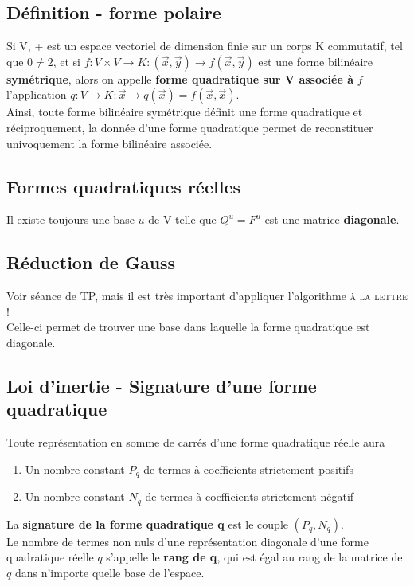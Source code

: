 \documentclass[12pt, a4paper, openany]{article}
\begin{document}
\subsection{Définition - forme polaire}
Si V, + est un espace vectoriel de dimension finie sur un corps K commutatif, tel que $0 \neq 2$, et si $f : V \times V \rightarrow K : (\vec{x}, \vec{y}) \rightarrow f(\vec{x}, \vec{y})$ est une forme bilinéaire \textbf{symétrique}, alors on appelle \textbf{forme quadratique sur V associée à} $f$ l'application $q : V \rightarrow K : \vec{x} \rightarrow q(\vec{x}) = f(\vec{x}, \vec{x})$.\\

Ainsi, toute forme bilinéaire symétrique définit une forme quadratique et réciproquement, la donnée d'une forme quadratique permet de reconstituer univoquement la forme bilinéaire associée.

\subsection{Formes quadratiques réelles}
Il existe toujours une base $u$ de V telle que $Q^u = F^u$ est une matrice \textbf{diagonale}.

\subsection{Réduction de Gauss}
Voir séance de TP, mais il est très important d'appliquer l'algorithme \textsc{à la lettre} !\\
Celle-ci permet de trouver une base dans laquelle la forme quadratique est diagonale.

\subsection{Loi d'inertie - Signature d'une forme quadratique}
Toute représentation en somme de carrés d'une forme quadratique réelle aura 
\begin{enumerate}
\item Un nombre constant $P_q$ de termes à coefficients strictement positifs
\item Un nombre constant $N_q$ de termes à coefficients strictement négatif
\end{enumerate}
La \textbf{signature de la forme quadratique q} est le couple $(P_q, N_q)$.\\

Le nombre de termes non nuls d'une représentation diagonale d'une forme quadratique réelle $q$ s'appelle le \textbf{rang de q}, qui est égal au rang de la matrice de $q$ dans n'importe quelle base de l'espace.
\end{document}
